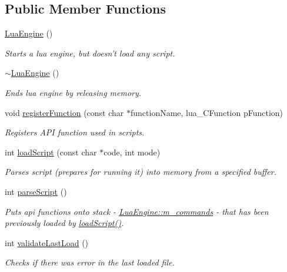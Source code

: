 \subsection*{Public Member Functions}
\begin{DoxyCompactItemize}
\item 
\hyperlink{class_lua_engine_a165d91bae4bef0670afd6f73a3e7e6a7}{Lua\-Engine} ()
\begin{DoxyCompactList}\small\item\em Starts a lua engine, but doesn't load any script. \end{DoxyCompactList}\item 
\hyperlink{class_lua_engine_ac72949ef59ee17465ce653f0c02c3eab}{$\sim$\-Lua\-Engine} ()
\begin{DoxyCompactList}\small\item\em Ends lua engine by releasing memory. \end{DoxyCompactList}\item 
void \hyperlink{class_lua_engine_a03530362918aceccd6f69a5cecf2a968}{register\-Function} (const char $\ast$function\-Name, lua\-\_\-\-C\-Function p\-Function)
\begin{DoxyCompactList}\small\item\em Registers A\-P\-I function used in scripts. \end{DoxyCompactList}\item 
int \hyperlink{class_lua_engine_aab9337ae5ea59bccc1e08c4015d42700}{load\-Script} (const char $\ast$code, int mode)
\begin{DoxyCompactList}\small\item\em Parses script (prepares for running it) into memory from a specified buffer. \end{DoxyCompactList}\item 
int \hyperlink{class_lua_engine_a5eae05f78704166f098ea20568c23fd7}{parse\-Script} ()
\begin{DoxyCompactList}\small\item\em Puts api functions onto stack -\/ \hyperlink{class_lua_engine_a86a3f32127e36e1ccce6c5a42a298ad5}{Lua\-Engine\-::m\-\_\-commands} -\/ that has been previously loaded by \hyperlink{class_lua_engine_aab9337ae5ea59bccc1e08c4015d42700}{load\-Script()}. \end{DoxyCompactList}\item 
int \hyperlink{class_lua_engine_ab039ca83afd2466f9fe52fcc69adfefb}{validate\-Last\-Load} ()
\begin{DoxyCompactList}\small\item\em Checks if there was error in the last loaded file. \end{DoxyCompactList}\item 

\end{DoxyCompactItemize}
